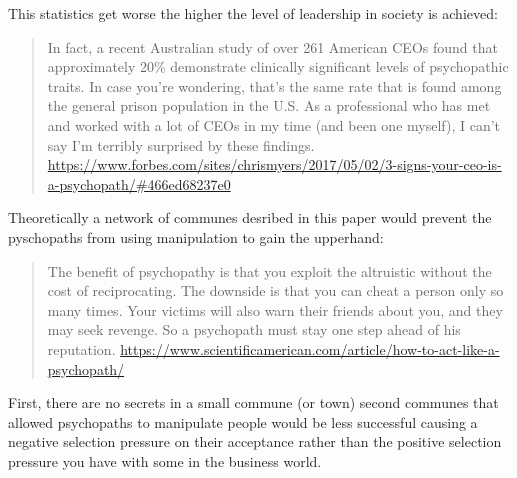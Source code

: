 \documentclass[11pt]{article}
\begin{document}
This statistics get worse the higher the level of leadership in society is achieved:
\begin{quote}
In fact, a recent Australian study of over 261 American CEOs found that approximately 20\% demonstrate clinically significant levels of psychopathic traits.
In case you’re wondering, that’s the same rate that is found among the general prison population in the U.S.
As a professional who has met and worked with a lot of CEOs in my time (and been one myself), I can’t say I’m terribly surprised by these findings. \url{https://www.forbes.com/sites/chrismyers/2017/05/02/3-signs-your-ceo-is-a-psychopath/#466ed68237e0}
\end{quote} 
Theoretically a network of communes desribed in this paper would prevent the pyschopaths from using manipulation to gain the upperhand:
\begin{quote}
The benefit of psychopathy is that you exploit the altruistic without the cost of reciprocating. The downside is that you can cheat a person only so many times. Your victims will also warn their friends about you, and they may seek revenge. So a psychopath must stay one step ahead of his reputation. \url{https://www.scientificamerican.com/article/how-to-act-like-a-psychopath/}
\end{quote} 
First, there are no secrets in a small commune (or town) second communes that allowed psychopaths to manipulate people would be less successful causing a negative selection pressure on their acceptance rather than the positive selection pressure you have with some in the business world. 
\end{document}
